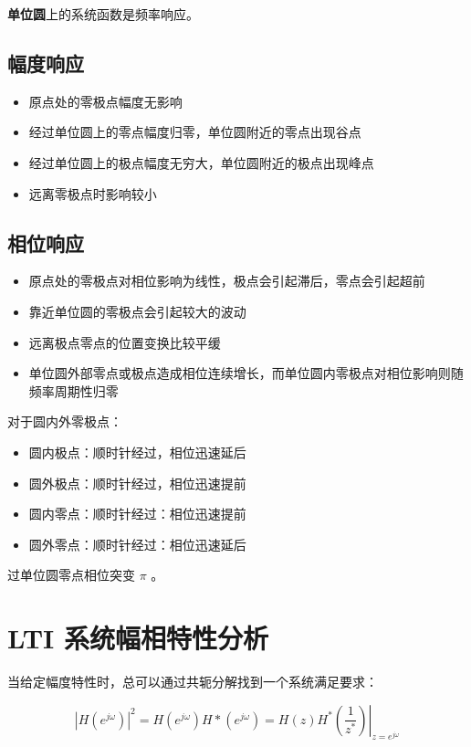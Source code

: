 \documentclass[cn,11pt,chinese,black,simple]{elegantbook}
\begin{document}
\textbf{单位圆}上的系统函数是频率响应。

\subsection{幅度响应}

\begin{itemize}
    \item 原点处的零极点幅度无影响
    \item 经过单位圆上的零点幅度归零，单位圆附近的零点出现谷点
    \item 经过单位圆上的极点幅度无穷大，单位圆附近的极点出现峰点
    \item 远离零极点时影响较小
\end{itemize}

\subsection{相位响应}

\begin{itemize}
    \item 原点处的零极点对相位影响为线性，极点会引起滞后，零点会引起超前
    \item 靠近单位圆的零极点会引起较大的波动
    \item 远离极点零点的位置变换比较平缓
    \item 单位圆外部零点或极点造成相位连续增长，而单位圆内零极点对相位影响则随频率周期性归零
\end{itemize}

对于圆内外零极点：

\begin{itemize}
    \item 圆内极点：顺时针经过，相位迅速延后
    \item 圆外极点：顺时针经过，相位迅速提前
    \item 圆内零点：顺时针经过：相位迅速提前
    \item 圆外零点：顺时针经过：相位迅速延后
\end{itemize}

过单位圆零点相位突变 \(\pi\) 。

\section{LTI 系统幅相特性分析}

当给定幅度特性时，总可以通过共轭分解找到一个系统满足要求：
 

\[
\left|H\left(e^{j \omega}\right)\right|^{2}=H\left(e^{j \omega}\right) H *\left(e^{j \omega}\right)=\left.H(z) H^{*}\left(\frac{1}{z^{*}}\right)\right|_{z=e^{j \omega}}
\]
\end{document}
